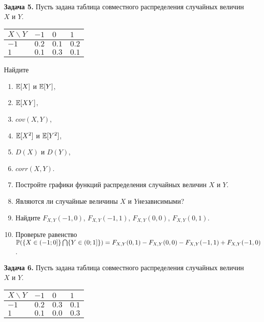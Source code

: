 \textbf{Задача 5.} Пусть задана таблица совместного распределения случайных величин $X$ и $Y$.

\begin{tabular}{|p{0.4in}|p{0.3in}|p{0.3in}|p{0.3in}|} \hline 
$X\backslash Y$ & $-1$ & $0$ & $1$ \\ \hline 
$-1$ & $0.2$ & $0.1$ & $0.2$ \\ \hline 
$1$ & $0.1$ & $0.3$ & $0.1$ \\ \hline 
\end{tabular}

Найдите

\begin{enumerate}
\item  ${\rm {\mathbb E}}[X]$ и ${\rm {\mathbb E}}[Y]$,

\item  ${\rm {\mathbb E}}[XY]$,

\item  $cov(X,Y)$,

\item  ${\rm {\mathbb E}}[X^{2} ]$ и ${\rm {\mathbb E}}[Y^{2} ]$,

\item  $D(X)$ и $D(Y)$,

\item  $corr(X,Y)$.

\item  Постройте графики функций распределения случайных величин $X$ и $Y$.

\item  Являются ли случайные величины  $X$ и $Y$независимыми?

\item  Найдите $F_{X,Y} (-1,0)$, $F_{X,Y} (-1,1)$, $F_{X,Y} (0,0)$, $F_{X,Y} (0,1)$.

\item  Проверьте равенство ${\rm {\mathbb P}}(\{ X\in (-1;0]\} \bigcap \{ Y\in (0;1]\} )=F_{X,Y} (0,1)-F_{X,Y} (0,0)-F_{X,Y} (-1,1)+F_{X,Y} (-1,0)$.
\end{enumerate}

\textbf{Задача 6.} Пусть задана таблица совместного распределения случайных величин $X$ и $Y$.

\begin{tabular}{|p{0.4in}|p{0.3in}|p{0.3in}|p{0.3in}|} \hline 
$X\backslash Y$ & $-1$ & $0$ & $1$ \\ \hline 
$-1$ & $0.2$ & $0.3$ & $0.1$ \\ \hline 
$1$ & $0.1$ & $0.0$ & $0.3$ \\ \hline 
\end{tabular}


